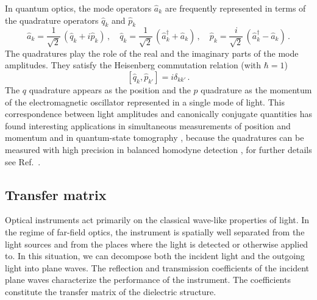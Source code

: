 \documentclass[12pt,amsmath,amssymb]{article}
\numberwithin{equation}{section}
\begin{document}
In quantum optics, the mode operators $\hat{a}_k$ are frequently represented
in terms of the quadrature operators $\hat{q}_k$ and $\hat{p}_k$
\cite{Leonhardt}
\begin{equation}
\label{eq:quad} \hat{a}_k =
\frac{1}{\sqrt{2}}\,(\hat{q}_k+i\hat{p}_k)\,,\quad \hat{q}_k =
\frac{1}{\sqrt{2}}\,(\hat{a}_k^\dagger+\hat{a}_k)\,,\quad
\hat{p}_k = \frac{i}{\sqrt{2}}\,(\hat{a}_k^\dagger-\hat{a}_k)\,.
\end{equation}
The quadratures play the role of the real and the imaginary parts of the
mode amplitudes. They satisfy the Heisenberg commutation relation
(with $\hbar =1$)
\begin{equation}
\label{eq:heisen} [\hat{q}_k,\hat{p}_{k'}] = i \delta_{kk'}\,.
\end{equation}
The $q$ quadrature appears as the position and the $p$ quadrature as
the momentum of the electromagnetic oscillator represented in a single
mode of light. This correspondence between light amplitudes
and canonically conjugate quantities has found interesting applications
in simultaneous measurements of position and momentum
\cite{Leonhardt,WalkerCarroll,Walker}
and in quantum-state tomography
\cite{Breitenbach,LeoPaul,Leonhardt,Lvovsky,Smithey,Welsch},
because the quadratures can be measured with high precision
in balanced homodyne detection \cite{Abbas,YuenChan},
for further details see Ref.\ \cite{Leonhardt}.

\subsection{Transfer matrix}

Optical instruments act primarily on the classical wave-like properties of light.
In the regime of far-field optics, the instrument is spatially well separated
from the light sources and from the places where the light is detected
or otherwise applied to.
In this situation, we can decompose both the incident light and the outgoing
light into plane waves. The reflection and transmission coefficients
of the incident plane waves characterize the performance of the instrument.
The coefficients constitute the transfer matrix of the dielectric structure.
\end{document}
